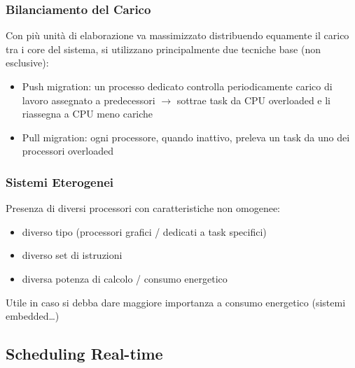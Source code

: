 \documentclass{article}
\begin{document}
\subsubsection{Bilanciamento del Carico}
Con più unità di elaborazione va massimizzato distribuendo equamente il carico tra i core del sistema, si utilizzano principalmente due tecniche base (non esclusive):
\begin{itemize}
    \item Push migration: un processo dedicato controlla periodicamente carico di lavoro assegnato a predecessori $\rightarrow$ sottrae task da CPU overloaded e li riassegna a CPU meno cariche
    \item Pull migration: ogni processore, quando inattivo, preleva un task da uno dei processori overloaded
\end{itemize}
\subsubsection{Sistemi Eterogenei}
Presenza di diversi processori con caratteristiche non omogenee:
\begin{itemize}
    \item diverso tipo (processori grafici / dedicati a task specifici)
    \item diverso set di istruzioni
    \item diversa potenza di calcolo / consumo energetico
\end{itemize}
Utile in caso si debba dare maggiore importanza a consumo energetico (sistemi embedded…)
\subsection{Scheduling Real-time}
\end{document}
